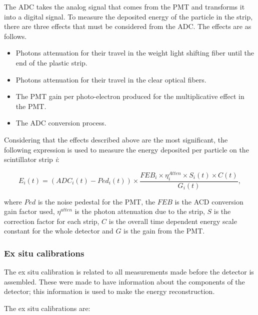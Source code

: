 The ADC takes the analog signal that comes from the PMT and transforms it into a digital signal. To measure the deposited energy of the particle in the strip, there are three effects that must be considered from the ADC. The effects are as follows.

\begin{itemize}
    \item Photons attenuation for their travel in the weight light shifting fiber until the end of the plastic strip. 
    \item Photons attenuation for their travel in the clear optical fibers.
    \item The PMT gain per photo-electron produced for the multiplicative effect in the PMT. 
    \item The ADC conversion process. 
\end{itemize}

Considering that the effects described above are the most significant, the following expression is used to measure the energy deposited per particle on the scintillator strip \textit{i}: 

\begin{equation}
    E_i(t) = (ADC_i(t) - Ped_i(t)) \times \frac{FEB_i \times \eta^{Atten}_i \times S_i(t) \times C(t)}{G_i(t)},
    \label{eq:DepositedEnergy}
\end{equation}

where $Ped$ is the noise pedestal for the PMT, the $FEB$ is the ACD conversion gain factor used, $\eta^{atten}$ is the photon attenuation due to the strip, $S$ is the correction factor for each strip, $C$ is the overall time dependent energy scale constant for the whole detector and $G$ is the gain from the PMT.

\subsubsection{Ex situ calibrations}
\label{Cap:MnvExp:MnvDetector:Calibration:ExSitu}
The ex situ calibration is related to all measurements made before the detector is assembled. These were made to have information about the components of the detector; this information is used to make the energy reconstruction. 

The ex situ calibrations are:

